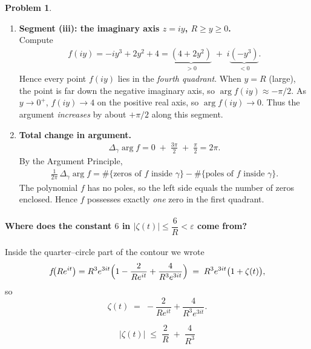 \documentclass[12pt]{article}
\theoremstyle{definition} %
\newtheorem{problem}{Problem}
\theoremstyle{plain} %
\begin{document}
\begin{problem}
\begin{enumerate}
        \item\textbf{Segment (iii): the imaginary axis $z=iy$, $R\ge y\ge0$.}\\
              Compute
              \begin{align}
                  f(iy)=-iy^{3}+2y^{2}+4
                        =\underbrace{(4+2y^{2})}_{>0}\;+\;i\underbrace{(-y^{3})}_{<0}.
              \end{align}
              Hence every point $f(iy)$ lies in the \emph{fourth quadrant}.  
              When $y=R$ (large), the point is far down the negative imaginary axis, so $\arg f(iy)\approx-\pi/2$.  
              As $y\to0^{+}$, $f(iy)\to4$ on the positive real axis, so $\arg f(iy)\to0$.  
              Thus the argument \emph{increases} by about $+\pi/2$ along this segment.
        
        \item\textbf{Total change in argument.}\\
              \begin{align}
                  \Delta_{\gamma}\arg f
                  =0\;+\;\frac{3\pi}{2}\;+\;\frac{\pi}{2}=2\pi.
              \end{align}
              By the Argument Principle,
              \begin{align}
                  \frac{1}{2\pi}\,\Delta_{\gamma}\arg f
                  =\#\{\text{zeros of }f\text{ inside }\gamma\}
                  -\#\{\text{poles of }f\text{ inside }\gamma\}.
              \end{align}
              The polynomial $f$ has no poles, so the left side equals the number of zeros enclosed.  
              Hence $f$ possesses exactly \emph{one} zero in the first quadrant.
    \end{enumerate}
\end{problem}

\paragraph{Where does the constant \(6\) in \(\lvert\zeta(t)\rvert\le \dfrac{6}{R}<\varepsilon\) come from?}

Inside the quarter–circle part of the contour we wrote
\[
    f\!\bigl(Re^{it}\bigr)=R^{3}e^{3it}
    \Bigl(
        1-\frac{2}{Re^{it}}+\frac{4}{R^{3}e^{3it}}
    \Bigr)
    \;=\;
    R^{3}e^{3it}\bigl(1+\zeta(t)\bigr),
\]
so
\[
    \zeta(t)\;=\;-\frac{2}{Re^{it}}+\frac{4}{R^{3}e^{3it}}.
\]

\[
\boxed{\displaystyle
   \bigl\lvert\zeta(t)\bigr\rvert
   \;\le\;
   \frac{2}{R}\;+\;\frac{4}{R^{3}}
}
\]
\end{document}
